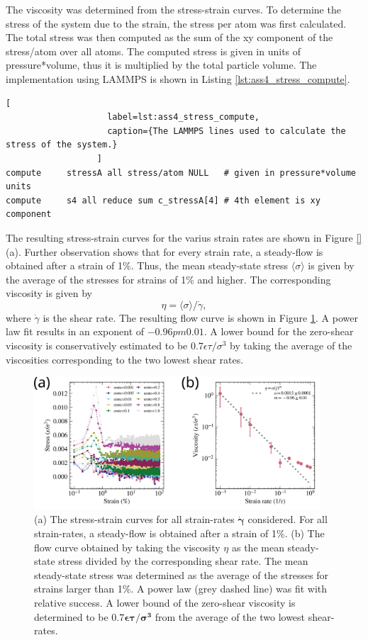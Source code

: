 \documentclass[10pt,a4paper]{labreport}
\begin{document}
The viscosity was determined from the stress-strain curves. 
To determine the stress of the system due to the strain, the stress per atom was first calculated. 
The total stress was then computed as the sum of the xy component of the stress/atom  over all atoms. The computed stress is given in units of pressure*volume, thus it is multiplied by the total particle volume. 
The implementation using LAMMPS is shown in Listing \ref{lst:ass4_stress_compute}.
\begin{lstlisting}[
                    label=lst:ass4_stress_compute,
                    caption={The LAMMPS lines used to calculate the stress of the system.}
                  ]
compute     stressA all stress/atom NULL   # given in pressure*volume units 
compute     s4 all reduce sum c_stressA[4] # 4th element is xy component
\end{lstlisting}
The resulting stress-strain curves for the varius strain rates are shown in Figure \ref{}(a). 
Further observation shows that for every strain rate, a steady-flow is obtained after a strain of 1\%.
Thus, the mean steady-state stress $\langle \sigma \rangle$ is given by the average of the stresses for strains of 1\% and higher.
The corresponding viscosity is given by 
\begin{equation}
\eta = \langle \sigma \rangle / \dot\gamma,
\end{equation}
where $\dot{\gamma}$ is the shear rate. 
The resulting flow curve is shown in Figure \ref{fig:ass4_flows}. 
A power law fit results in an exponent of $-0.96 pm 0.01$. 
A lower bound for the zero-shear viscosity is conservatively estimated to be $0.7 \epsilon \tau / \sigma ^3$ by taking the average of the viscosities corresponding to the two lowest shear rates.
\begin{figure}[h!]
  \centering
  \includegraphics[width = 0.95\textwidth]{figs/ass4_strain.png}
  \caption{(a) The stress-strain curves for all strain-rates $\bm{\dot{\gamma}}$ considered. For all strain-rates, a steady-flow is obtained after a strain of 1\%. (b) The flow curve obtained by taking the viscosity $\eta$ as the mean steady-state stress divided by the corresponding shear rate. The mean steady-state stress was determined as the average of the stresses for strains larger than 1\%. A power law (grey dashed line) was fit with relative success. A lower bound of the zero-shear viscosity is determined to be $\bm{0.7 \epsilon \tau / \sigma ^3}$ from the average of the two lowest shear-rates. }
  \label{fig:ass4_flows}
\end{figure}
\end{document}
